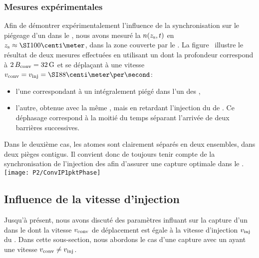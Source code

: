 \subsubsection{Mesures expérimentales}\label{sec:PiegeageMesure1pkt}
Afin de démontrer expérimentalement l'influence de la synchronisation sur le piégeage d'un \pat dans le \tpIP, nous avons mesuré la \datlin $n({z_{\rm s}},t)$ en $\zsonde\approx\cm{100}$, \cad dans la zone couverte par le \conv. 
\noindent La figure~ illustre le résultat de deux mesures effectuées en utilisant un \tp dont la profondeur correspond à $2\,{B_{\rm conv}}=\SI{32}{{\rm G}}$ et se déplaçant à une vitesse $\vconv=\vinj=\cmps{88}$:
\begin{itemize}
	\item l'une correspondant à un \pat intégralement piégé dans l'un des \pIPs,
	\item l'autre, obtenue avec la même \seqexp, mais en retardant l'injection du \p de . Ce déphasage correspond à la moitié du temps séparant l'arrivée de deux barrières successives.
\end{itemize}
Dans le deuxième cas, les atomes sont clairement séparés en deux ensembles, dans deux pièges contigus. 
Il convient donc de toujours tenir compte de la synchronisation de l'injection des \pats afin d'assurer une capture optimale dans le \tpIP.
%
\bfighss
\texttt{[image: P2/ConvIP1pktPhase]}
\label{fig:ConvIP1pktPhase}
\efigh


\casse


\subsection{Influence de la vitesse d'injection}\label{sec:InfluenceVitesseConv}

Jusqu'à présent, nous avons discuté des paramètres influant sur la capture d'un \p dans le \tpIP dont la vitesse ${v_{\rm conv}}$ de déplacement est égale à la vitesse d'injection $v_{{\rm {inj}}}$ du \p. Dans cette sous-section, nous abordons le cas d'une capture avec un \conv ayant une vitesse ${v_{\rm conv}}\neq v_{{\rm {inj}}}$.

